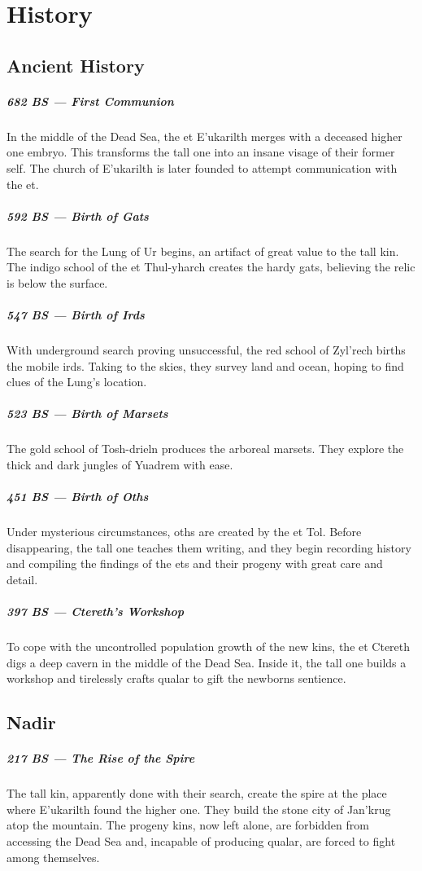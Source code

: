\section{History} \label{sec::history}

\subsection*{Ancient History}
\subparagraph{682 BS --- First Communion} In the middle of the Dead Sea, the et E'ukarilth merges with a deceased higher one embryo.
This transforms the tall one into an insane visage of their former self.
The church of E'ukarilth is later founded to attempt communication with the et.

\subparagraph{592 BS --- Birth of Gats} The search for the Lung of Ur begins, an artifact of great value to the tall kin.
The indigo school of the et Thul-yharch creates the hardy gats, believing the relic is below the surface.

\subparagraph{547 BS --- Birth of Irds} With underground search proving unsuccessful, the red school of Zyl'rech births the mobile irds.
Taking to the skies, they survey land and ocean, hoping to find clues of the Lung's location.

\subparagraph{523 BS --- Birth of Marsets} The gold school of Tosh-drieln produces the arboreal marsets.
They explore the thick and dark jungles of Yuadrem with ease.

\subparagraph{451 BS --- Birth of Oths} Under mysterious circumstances, oths are created by the et Tol.
Before disappearing, the tall one teaches them writing, and they begin recording history and compiling the findings of the ets and their progeny with great care and detail.

\subparagraph{397 BS --- Ctereth's Workshop} To cope with the uncontrolled population growth of the new kins, the et Ctereth digs a deep cavern in the middle of the Dead Sea.
Inside it, the tall one builds a workshop and tirelessly crafts qualar to gift the newborns sentience.

\subsection*{Nadir}
\subparagraph{217 BS --- The Rise of the Spire} The tall kin, apparently done with their search, create the spire at the place where E'ukarilth found the higher one.
They build the stone city of Jan'krug atop the mountain.
The progeny kins, now left alone, are forbidden from accessing the Dead Sea and, incapable of producing qualar, are forced to fight among themselves.


